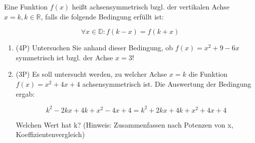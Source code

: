\item Eine Funktion $f(x)$ heißt achsensymmetrisch bzgl. der vertikalen Achse $x=k, k\in\mathbb{R}$, falls die folgende Bedingung erfüllt ist:

$$\forall x \in \mathbb{D}: f(k-x) = f(k+x)$$

\begin{enumerate}

\item (4P) Untersuchen Sie anhand dieser Bedingung, ob $f(x) = x^2+9-6x$ symmetrisch ist bzgl. der Achse $x=3$!

\item  (3P) Es soll untersucht werden, zu welcher Achse $x=k$ die Funktion $f(x) = x^2+4x+4$ achsensymmetrisch ist. Die Auswertung der Bedingung ergab:

$$k^2-2kx+4k+x^2-4x+4 = k^2 + 2kx + 4k + x^2 + 4x +4$$

Welchen Wert hat k? (Hinweis: Zusammenfassen nach Potenzen von x, Koeffizientenvergleich)

\end{enumerate}

